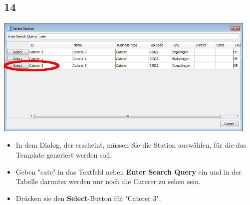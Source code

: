 \documentclass{beamer}
\begin{document}
\subsection{14}
\begin{frame}
	\begin{center}
  		\includegraphics[width=0.95\textwidth]{14.png}
	\end{center}
	\begin{itemize}
		\item In dem Dialog, der erscheint, müssen Sie die Station auswählen, für die das Template generiert werden soll.
		\item Geben "cate" in das Textfeld neben \textbf{Enter Search Query} ein und in der Tabelle darunter werden nur noch die Caterer zu sehen sein.
		\item Drücken sie den \textbf{Select}-Button für "Caterer 3".
	\end{itemize}
\end{frame}
\end{document}
